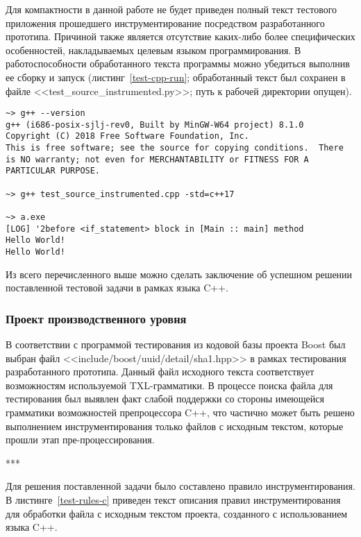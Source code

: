 Для компактности в данной работе не будет приведен полный текст тестового приложения прошедшего инструментирование посредством разработанного прототипа.
Причиной также является отсутствие каких-либо более специфических особенностей, накладываемых целевым языком программирования.
В работоспособности обработанного текста программы можно убедиться выполнив ее сборку и запуск (листинг~\ref{test-cpp-run}; обработанный текст был сохранен в файле <<test\_source\_instrumented.py>>; путь к рабочей директории опущен).

\begin{lstlisting}[frame=single, label={test-cpp-run}, caption={Результаты сборки и запуска обработанного тестового приложения.}]
~> g++ --version
g++ (i686-posix-sjlj-rev0, Built by MinGW-W64 project) 8.1.0
Copyright (C) 2018 Free Software Foundation, Inc.
This is free software; see the source for copying conditions.  There is NO warranty; not even for MERCHANTABILITY or FITNESS FOR A PARTICULAR PURPOSE.

~> g++ test_source_instrumented.cpp -std=c++17

~> a.exe
[LOG] '2before <if_statement> block in [Main :: main] method
Hello World!
Hello World!
\end{lstlisting}

Из всего перечисленного выше можно сделать заключение об успешном решении поставленной тестовой задачи в рамках языка C++.

\subsubsection{Проект производственного уровня}

В соответствии с программой тестирования из кодовой базы проекта Boost был выбран файл <<include/boost/uuid/detail/sha1.hpp>> в рамках тестирования разработанного прототипа.
Данный файл исходного текста соответствует возможностям используемой TXL-грамматики.
В процессе поиска файла для тестирования был выявлен факт слабой поддержки со стороны имеющейся грамматики возможностей препроцессора C++, что частично может быть решено выполнением инструментирования только файлов с исходным текстом, которые прошли этап пре-процессирования.

***

Для решения поставленной задачи было составлено правило инструментирования.
В листинге~\ref{test-rules-c} приведен текст описания правил инструментирования для обработки файла с исходным текстом проекта, созданного с использованием языка C++.

